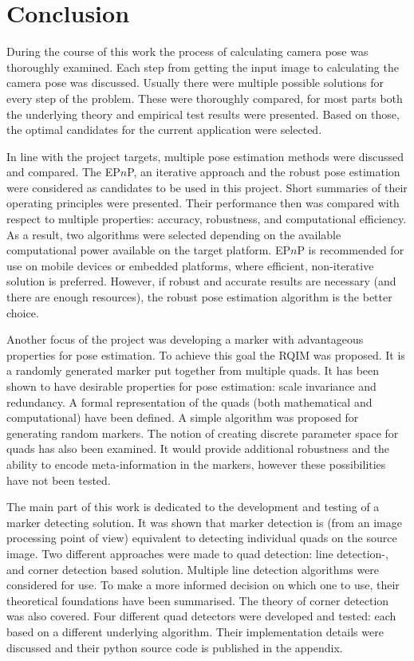 \chapter{Conclusion}\label{sect:conclusion}

During the course of this work the process of calculating camera pose was thoroughly examined.
Each step from getting the input image to calculating the camera pose was discussed.
Usually there were multiple possible solutions for every step of the problem.
These were thoroughly compared, for most parts both the underlying theory and empirical test results were presented.
Based on those, the optimal candidates for the current application were selected.

In line with the project targets, multiple pose estimation methods were discussed and compared.
The EP$n$P\cite{Lepetit2008}, an iterative approach\cite{iterative} and the robust pose estimation\cite{robust} were considered as candidates to be used in this project.
Short summaries of their operating principles were presented.
Their performance then was compared with respect to multiple properties: accuracy, robustness, and computational efficiency.
As a result, two algorithms were selected depending on the available computational power available on the target platform.
EP$n$P is recommended for use on mobile devices or embedded platforms, where efficient, non-iterative solution is preferred.
However, if robust and accurate results are necessary (and there are enough resources), the robust pose estimation algorithm is the better choice.

Another focus of the project was developing a marker with advantageous properties for pose estimation.
To achieve this goal the RQIM was proposed.
It is a randomly generated marker put together from multiple quads.
It has been shown to have desirable properties for pose estimation: scale invariance and redundancy.
A formal representation of the quads (both mathematical and computational) have been defined.
A simple algorithm was proposed for generating random markers.
The notion of creating discrete parameter space for quads has also been examined.
It would provide additional robustness and the ability to encode meta-information in the markers, however these possibilities have not been tested.

The main part of this work is dedicated to the development and testing of a marker detecting solution.
It was shown that marker detection is (from an image processing point of view) equivalent to detecting individual quads on the source image.
Two different approaches were made to quad detection: line detection-, and corner detection based solution.
Multiple line detection algorithms were considered for use.
To make a more informed decision on which one to use, their theoretical foundations have been summarised.
The theory of corner detection was also covered.
Four different quad detectors were developed and tested: each based on a different underlying algorithm.
Their implementation details were discussed and their python source code is published in the appendix.

